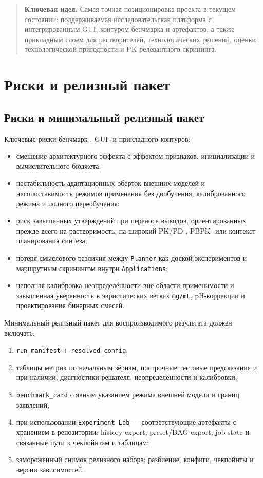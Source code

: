 \documentclass[11pt]{article}
\newcommand{\keyidea}[1]{\begin{quote}\textbf{Ключевая идея.} #1\end{quote}}
\begin{document}
\keyidea{Самая точная позиционировка проекта в текущем состоянии: поддерживаемая исследовательская платформа с интегрированным GUI, контуром бенчмарка и артефактов, а также прикладным слоем для растворителей, технологических решений, оценки технологической пригодности и PK-релевантного скрининга.}

\section{Риски и релизный пакет}

\subsection{Риски и минимальный релизный пакет}

Ключевые риски бенчмарк-, GUI- и прикладного контуров:
\begin{itemize}
  \item смешение архитектурного эффекта с эффектом признаков, инициализации и вычислительного бюджета;
  \item нестабильность адаптационных обёрток внешних моделей и несопоставимость режимов применения без дообучения, калиброванного режима и полного переобучения;
  \item риск завышенных утверждений при переносе выводов, ориентированных прежде всего на растворимость, на широкий PK/PD-, PBPK- или контекст планирования синтеза;
  \item потеря смыслового различия между \texttt{Planner} как доской экспериментов и маршрутным скринингом внутри \texttt{Applications};
  \item неполная калибровка неопределённости вне области применимости и завышенная уверенность в эвристических ветках \texttt{mg/mL}, pH-коррекции и проектирования бинарных смесей.
\end{itemize}

Минимальный релизный пакет для воспроизводимого результата должен включать:
\begin{enumerate}
  \item \texttt{run\_manifest} + \texttt{resolved\_config};
  \item таблицы метрик по начальным зёрнам, построчные тестовые предсказания и, при наличии, диагностики решателя, неопределённости и калибровки;
  \item \texttt{benchmark\_card} с явным указанием режима внешней модели и границ заявлений;
  \item при использовании \texttt{Experiment Lab} --- соответствующие артефакты с хранением в репозитории: history-export, preset/DAG-export, job-state и связанные пути к чекпойнтам и таблицам;
  \item замороженный снимок релизного набора: разбиение, конфиги, чекпойнты и версии зависимостей.
\end{enumerate}
\end{document}
